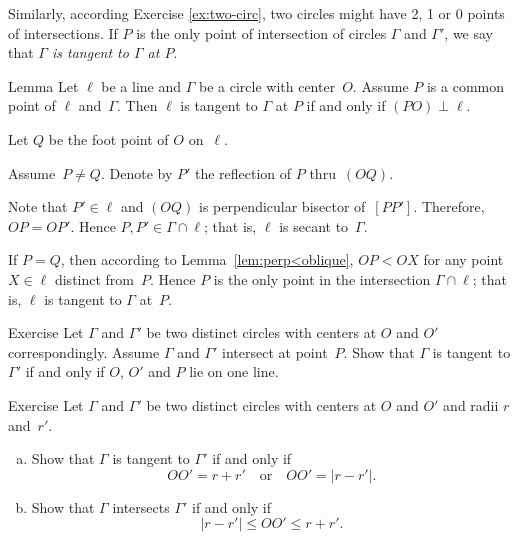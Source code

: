 Similarly, according Exercise \ref{ex:two-circ},
two circles might have 2, 1 or 0 points of intersections.
If $P$ is the only point of intersection of circles $\Gamma$ and $\Gamma'$,
we say that \emph{$\Gamma$ is tangent to $\Gamma$ at $P$}. 

\begin{thm}{Lemma}\label{lem:tangent}
Let $\ell$ be a line and $\Gamma$ be a circle with center~$O$.
Assume $P$ is a common point of $\ell$ and~$\Gamma$. 
Then $\ell$ is tangent to $\Gamma$ at $P$ if and only if $(PO)\perp \ell$.
\end{thm}

Let $Q$ be the foot point of $O$ on~$\ell$.

Assume~$P\ne Q$.
Denote by $P'$ the reflection of $P$ thru~$(OQ)$.

Note that $P'\in\ell$ and $(OQ)$ is perpendicular bisector of~$[PP']$.
Therefore, $OP=OP'$.
Hence $P,P'\in \Gamma\cap \ell$;
that is, $\ell$ is  secant to~$\Gamma$.

If $P=Q$, 
then according to Lemma~\ref{lem:perp<oblique},
$OP<OX$ for any point $X\in \ell$ distinct from~$P$.
Hence $P$ is the only point in the intersection $\Gamma\cap\ell$;
that is, $\ell$ is tangent to $\Gamma$ at~$P$. 
\qeds

\begin{thm}{Exercise}\label{ex:tangent-circles}
Let $\Gamma$ and $\Gamma'$ be two distinct circles with centers at $O$ and $O'$ correspondingly. 
Assume $\Gamma$ and $\Gamma'$ intersect at point~$P$.
Show that $\Gamma$ is tangent to $\Gamma'$ if and only if $O$, $O'$ and $P$ lie on one line.
\end{thm}

\begin{thm}{Exercise}\label{ex:tangent-circles-2}
Let $\Gamma$ and $\Gamma'$ be two distinct circles with centers at $O$ and $O'$ and radii $r$ and~$r'$.

\begin{enumerate}[(a)]
\item\label{ex:tangent-circles-2:a} Show that $\Gamma$ is tangent to $\Gamma'$ if and only if
$$OO'=r+r'
\quad
\text{or}\quad
OO'=|r-r'|.$$
\item \label{ex:tangent-circles-2:b}
Show that $\Gamma$ intersects $\Gamma'$ if and only if
$$|r-r'|\le OO'\le r+r'.$$
\end{enumerate}

\end{thm}

